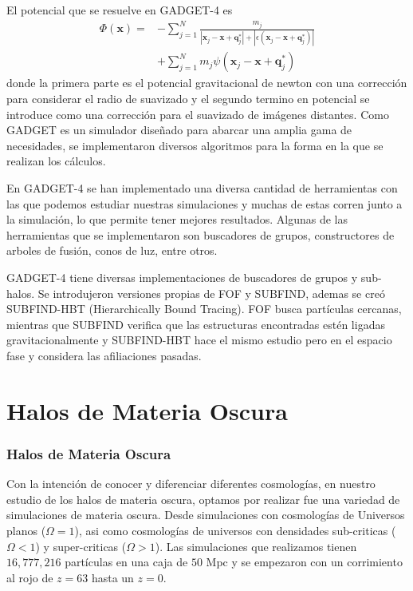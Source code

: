 \documentclass{beamer}
\begin{document}
	
	\begin{frame}
		El potencial que se resuelve en GADGET-4 es 
		\begin{align}
			\Phi (\textbf{x}) = &- \sum_{j=1}^{N} \frac{m_j}{|\textbf{x}_j-\textbf{x}+\textbf{q}^*_j| + |\epsilon(\textbf{x}_j-\textbf{x}+\textbf{q}^*_j)|} \nonumber \\
			&+ \sum_{j=1}^{N} m_j \psi (\textbf{x}_j-\textbf{x}+\textbf{q}^*_j) \label{eq:Pot}
		\end{align}
		donde la primera parte es el potencial gravitacional de newton con una corrección para considerar el radio de suavizado y el segundo termino en potencial se introduce como una corrección para el suavizado de imágenes distantes. Como GADGET es un simulador diseñado para abarcar una amplia gama de necesidades, se implementaron diversos algoritmos para la forma en la que se realizan los cálculos.
	\end{frame}
	
	\begin{frame}
		En GADGET-4 se han implementado una diversa cantidad de herramientas con las que podemos estudiar nuestras simulaciones y muchas de estas corren junto a la simulación, lo que permite tener mejores resultados. Algunas de las herramientas que se implementaron son buscadores de grupos, constructores de arboles de fusión, conos de luz, entre otros.
	\end{frame}
	
	\begin{frame}
		GADGET-4 tiene diversas implementaciones de buscadores de grupos y sub-halos. Se introdujeron versiones propias de FOF y SUBFIND, ademas se creó SUBFIND-HBT (Hierarchically Bound Tracing). FOF busca partículas cercanas, mientras que SUBFIND verifica que las estructuras encontradas estén ligadas gravitacionalmente y SUBFIND-HBT hace el mismo estudio pero en el espacio fase y considera las afiliaciones pasadas.
	
	\end{frame}


\section{Halos de Materia Oscura}
\setcounter{equation}{0}
	\begin{frame}
		\frametitle{Halos de Materia Oscura}
		Con la intención de conocer y diferenciar diferentes cosmologías, en nuestro estudio de los halos de materia oscura, optamos por realizar fue una variedad de simulaciones de materia oscura. Desde simulaciones con cosmologías de Universos planos ($\Omega=1$), asi como cosmologías de universos con densidades sub-criticas ($\Omega < 1$) y super-criticas ($\Omega > 1$). Las simulaciones que realizamos tienen $16,777,216$ partículas en una caja de $50$ Mpc y se empezaron con un corrimiento al rojo de $z = 63$ hasta un $z = 0$.
		
	\end{frame}
\end{document}
